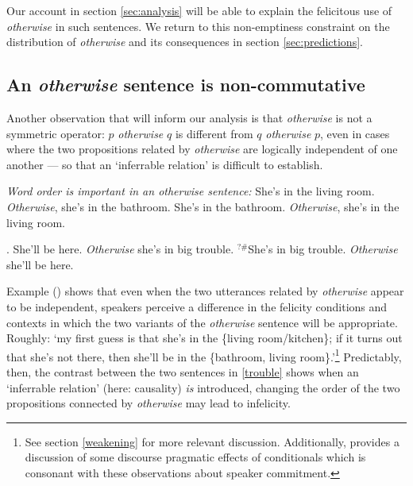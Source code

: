 
Our account in section \ref{sec:analysis} will be able to explain the felicitous use of \textit{otherwise} in such sentences. We return to this non-emptiness constraint on the distribution of \textit{otherwise} and its consequences in section \ref{sec:predictions}.


\subsection{An \textit{otherwise} sentence is  non-commutative} 

Another observation that will inform our analysis is that \textit{otherwise} is not a symmetric operator: $p$ \textit{otherwise} $q$ is different from $q$ \textit{otherwise} $p$, even in cases where the two propositions related by \textit{otherwise} are logically independent of one another --- so that an `inferrable relation' is difficult to establish.  

\pex  \textit{Word order is important in an \emph{otherwise} sentence:}
\a  She's in the living room. \textit{Otherwise}, she's in the bathroom. 
\a  She's in the bathroom. \textit{Otherwise}, she's in the living room. \xe


\pex \label{trouble}\a. She'll be here. \textit{Otherwise} she's in big trouble.
\a  $ ^{?\#} $She's in big trouble. \textit{Otherwise} she'll be here.\xe

Example (\blastx) shows that even when the two utterances related by \textit{otherwise} appear to be independent, speakers perceive a difference in the felicity conditions and contexts in which the two variants of the \textit{otherwise} sentence will be appropriate. Roughly: `my first guess is that she's in the \{living room/kitchen\}; if it turns out that she's not there, then she'll be in the \{bathroom, living room\}.'\footnote{See section \ref{weakening} for more relevant discussion. Additionally, \citealt{Ford1997} provides a discussion of some discourse pragmatic effects of conditionals which is consonant with these observations about speaker commitment.} Predictably, then, the contrast between the two sentences in \ref{trouble} shows when an `inferrable relation' (here: causality) \textit{is} introduced, changing the order of the two propositions connected by \textit{otherwise} may lead to infelicity. 

